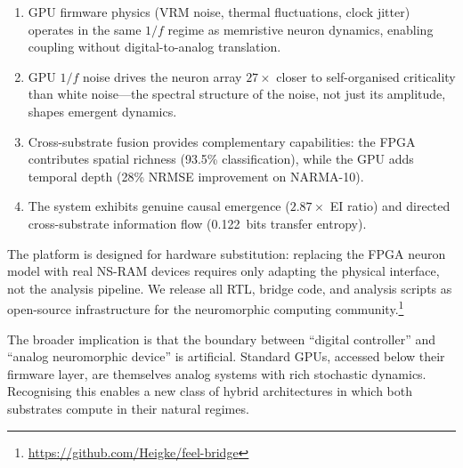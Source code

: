 \documentclass[11pt]{article}
\begin{document}
\begin{enumerate}[leftmargin=1.5em, itemsep=2pt]
  \item GPU firmware physics (VRM noise, thermal fluctuations,
    clock jitter) operates in the same $1/f$ regime as
    memristive neuron dynamics, enabling coupling without
    digital-to-analog translation.
  \item GPU $1/f$ noise drives the neuron array $27\times$
    closer to self-organised criticality than white noise---the
    spectral structure of the noise, not just its amplitude,
    shapes emergent dynamics.
  \item Cross-substrate fusion provides complementary
    capabilities: the FPGA contributes spatial richness
    (93.5\% classification), while the GPU adds temporal
    depth (28\% NRMSE improvement on NARMA-10).
  \item The system exhibits genuine causal emergence
    ($2.87\times$ EI ratio) and directed cross-substrate
    information flow (0.122~bits transfer entropy).
\end{enumerate}

The platform is designed for hardware substitution: replacing
the FPGA neuron model with real NS-RAM devices requires only
adapting the physical interface, not the analysis pipeline.
We release all RTL, bridge code, and analysis scripts as
open-source infrastructure for the neuromorphic computing
community.\footnote{\url{https://github.com/Heigke/feel-bridge}}

The broader implication is that the boundary between
``digital controller'' and ``analog neuromorphic device'' is
artificial.  Standard GPUs, accessed below their firmware
layer, are themselves analog systems with rich stochastic
dynamics.  Recognising this enables a new class of hybrid
architectures in which both substrates compute in their
natural regimes.
\end{document}
